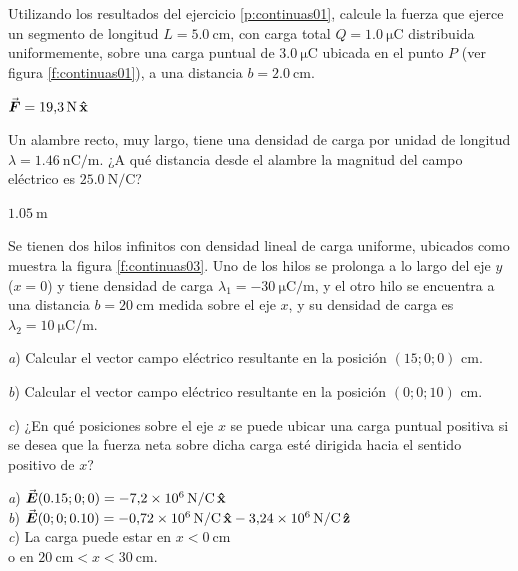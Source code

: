 %
\begin{Exercise}
  Utilizando los resultados del ejercicio \ref{p:continuas01}, calcule la fuerza que ejerce un segmento de longitud $L = \SI{5.0}{\centi\metre}$, con carga total $Q = \SI{1.0}{\micro\coulomb}$ distribuida uniformemente, sobre una carga puntual de $\SI{3.0}{\micro\coulomb}$ ubicada en el punto $P$ (ver figura \ref{f:continuas01}), a una distancia $b = \SI{2.0}{\centi\metre}$.
\end{Exercise}
\begin{Answer}
  $\va*{F} = \SI{19.3}{\newton}\,\vu{x}$
\end{Answer}
%
\begin{Exercise}
  Un alambre recto, muy largo, tiene una densidad de carga por unidad de longitud $\lambda = \SI{1.46}{\nano\coulomb/\metre}$. ¿A qué distancia desde el alambre la magnitud del campo eléctrico es $\SI{25.0}{\newton/\coulomb}$?
\end{Exercise}
\begin{Answer}
  $\SI{1.05}{\metre}$
\end{Answer}
%
\begin{Exercise}\label{p:continuas03}
Se tienen dos hilos infinitos con densidad lineal de carga uniforme, ubicados como muestra la figura \ref{f:continuas03}. Uno de los hilos se prolonga a lo largo del eje $y$ ($x=0$) y tiene densidad de carga $\lambda_1 = \SI{-30}{\micro\coulomb/\metre}$, y el otro hilo se encuentra a una distancia $b = \SI{20}{\centi\metre}$ medida sobre el eje $x$, y su densidad de carga es $\lambda_2 = \SI{10}{\micro\coulomb/\metre}$.\par\medskip
\textit{a}) Calcular el vector campo eléctrico resultante en la posición $(15;0;0)\text{ cm}$.\par\medskip 
\textit{b}) Calcular el vector campo eléctrico resultante en la posición $(0;0;10)\text{ cm}$. \par\medskip
\textit{c}) ¿En qué posiciones sobre el eje $x$ se puede ubicar una carga puntual positiva si se desea que la fuerza neta sobre dicha carga esté dirigida hacia el sentido positivo de $x$?
\end{Exercise}
\begin{Answer}
  \begin{minipage}[t]{.4\textwidth}
    \textit{a}) $\va*{E}(0.15;0;0) = \SI{-7.2E6}{N/C}\,\vu{x}$\\
    \textit{b}) $\va*{E}(0;0;0.10) = \SI{-0.72E6}{N/C}\,\vu{x} - \SI{3.24E6}{N/C}\,\vu{z}$\\
    \textit{c}) La carga puede estar en $ x < \SI{0}{\centi\metre}$ \\ o en $\SI{20}{\centi\metre} < x < \SI{30}{\centi\metre}.$
  \end{minipage}
\end{Answer}
